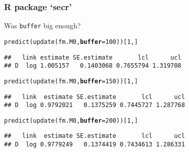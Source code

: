 \documentclass[color=usenames,dvipsnames]{beamer}\usepackage[]{graphicx}\usepackage[]{color}
\makeatletter
\newcommand{\hlnum}[1]{\textcolor[rgb]{0.69,0.494,0}{#1}}%
\newcommand{\hlstd}[1]{\textcolor[rgb]{0,0,0}{#1}}%
\newcommand{\hlkwc}[1]{\textcolor[rgb]{0,0,0}{\textbf{#1}}}%
\newcommand{\hlkwd}[1]{\textcolor[rgb]{0.004,0.004,0.506}{#1}}%
\newenvironment{kframe}{%
 \def\at@end@of@kframe{}%
 \ifinner\ifhmode%
  \def\at@end@of@kframe{\end{minipage}}%
  \begin{minipage}{\columnwidth}%
 \fi\fi%
 \def\FrameCommand##1{\hskip\@totalleftmargin \hskip-\fboxsep
 \colorbox{shadecolor}{##1}\hskip-\fboxsep
     \hskip-\linewidth \hskip-\@totalleftmargin \hskip\columnwidth}%
 \MakeFramed {\advance\hsize-\width
   \@totalleftmargin\z@ \linewidth\hsize
   \@setminipage}}%
 {\par\unskip\endMakeFramed%
 \at@end@of@kframe}
\newenvironment{knitrout}{}{} %
\newcommand{\inr}[1]{\colorbox{inlinecolor}{\texttt{#1}}}
\makeatother
\begin{document}
\begin{frame}[fragile]
  \frametitle{R package `secr'}
  \small
  Was \inr{buffer} big enough?
\begin{knitrout}\scriptsize
{}\color{fgcolor}\begin{kframe}
\begin{alltt}
\hlkwd{predict}\hlstd{(}\hlkwd{update}\hlstd{(fm.M0,} \hlkwc{buffer}\hlstd{=}\hlnum{100}\hlstd{))[}\hlnum{1}\hlstd{,]}
\end{alltt}
\begin{verbatim}
##   link estimate SE.estimate       lcl      ucl
## D  log 1.005157   0.1403068 0.7655794 1.319708
\end{verbatim}
\end{kframe}
\end{knitrout}
\pause
\vspace{-12pt}
\begin{knitrout}\scriptsize
{}\color{fgcolor}\begin{kframe}
\begin{alltt}
\hlkwd{predict}\hlstd{(}\hlkwd{update}\hlstd{(fm.M0,} \hlkwc{buffer}\hlstd{=}\hlnum{150}\hlstd{))[}\hlnum{1}\hlstd{,]}
\end{alltt}
\begin{verbatim}
##   link  estimate SE.estimate       lcl      ucl
## D  log 0.9792021   0.1375259 0.7445727 1.287768
\end{verbatim}
\end{kframe}
\end{knitrout}
\pause
\vspace{-12pt}
\begin{knitrout}\scriptsize
{}\color{fgcolor}\begin{kframe}
\begin{alltt}
\hlkwd{predict}\hlstd{(}\hlkwd{update}\hlstd{(fm.M0,} \hlkwc{buffer}\hlstd{=}\hlnum{200}\hlstd{))[}\hlnum{1}\hlstd{,]}
\end{alltt}
\begin{verbatim}
##   link  estimate SE.estimate       lcl      ucl
## D  log 0.9779249   0.1374419 0.7434613 1.286331
\end{verbatim}
\end{kframe}
\end{knitrout}
\pause
\vspace{-12pt}
\begin{knitrout}\scriptsize
{}\color{fgcolor}\begin{kframe}

\end{kframe}
\end{knitrout}
\end{frame}
\end{document}
